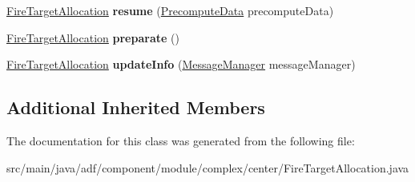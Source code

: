 \begin{DoxyCompactItemize}
\hyperlink{classadf_1_1component_1_1module_1_1complex_1_1center_1_1FireTargetAllocation}{Fire\+Target\+Allocation} {\bfseries resume} (\hyperlink{classadf_1_1agent_1_1precompute_1_1PrecomputeData}{Precompute\+Data} precompute\+Data)
\item 
\hypertarget{classadf_1_1component_1_1module_1_1complex_1_1center_1_1FireTargetAllocation_aaeda2936a727f339be1fdde42fa62eb2}{}\label{classadf_1_1component_1_1module_1_1complex_1_1center_1_1FireTargetAllocation_aaeda2936a727f339be1fdde42fa62eb2} 
\hyperlink{classadf_1_1component_1_1module_1_1complex_1_1center_1_1FireTargetAllocation}{Fire\+Target\+Allocation} {\bfseries preparate} ()
\item 
\hypertarget{classadf_1_1component_1_1module_1_1complex_1_1center_1_1FireTargetAllocation_a819a6518ff68f9068a56fb1cf09b4e2c}{}\label{classadf_1_1component_1_1module_1_1complex_1_1center_1_1FireTargetAllocation_a819a6518ff68f9068a56fb1cf09b4e2c} 
\hyperlink{classadf_1_1component_1_1module_1_1complex_1_1center_1_1FireTargetAllocation}{Fire\+Target\+Allocation} {\bfseries update\+Info} (\hyperlink{classadf_1_1agent_1_1communication_1_1MessageManager}{Message\+Manager} message\+Manager)
\end{DoxyCompactItemize}
\subsection*{Additional Inherited Members}


The documentation for this class was generated from the following file\+:\begin{DoxyCompactItemize}
\item 
src/main/java/adf/component/module/complex/center/Fire\+Target\+Allocation.\+java\end{DoxyCompactItemize}
